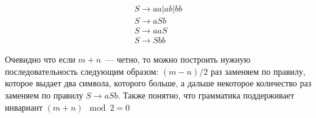 \documentclass[14pt]{extarticle}
\begin{document}
\begin{enumerate}
          \begin{gather*}
              S \to aa | ab | bb\\
              S \to a S b\\
              S \to aaS\\
              S \to Sbb
          \end{gather*}

          Очевидно что если $m + n$~--- четно, то можно построить нужную последовательность следующим 
          образом: $(m-n)/2$ раз заменяем по правилу, которое выдает два символа, которого больше, а дальше 
          некоторое количество раз заменяем по правилу $S \to aSb$. Также понятно, что грамматика поддерживает
          инвариант $(m + n) \mod 2 = 0$
\end{enumerate}
\end{document}
